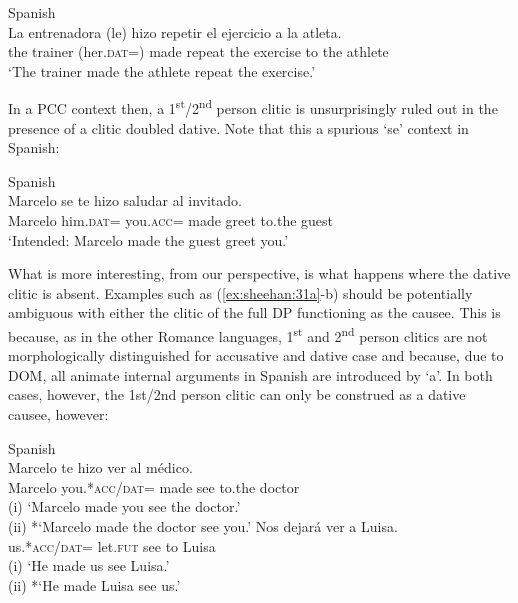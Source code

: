 \documentclass[output=paper,colorlinks,citecolor=brown,nonflat]{./langscibook}
\begin{document}
\ea%
    \label{ex:sheehan:29}
    Spanish \citep[448]{Torrego2010}\\
    \gll    La   entrenadora  (le)   hizo   repetir  el   ejercicio   a     la   atleta.\\
            the   trainer   (her.\textsc{dat}=)   made   repeat  the   exercise   to   the  athlete\\
    \glt    ‘The trainer made the athlete repeat the exercise.’
\z

In a PCC context then, a 1\textsuperscript{st}/2\textsuperscript{nd} person clitic is unsurprisingly ruled out in the presence of a clitic doubled dative. Note that this a spurious ‘se’ context in Spanish:

\ea%
    \label{ex:sheehan:30}
    Spanish\\
    \gll    *Marcelo   se   te   hizo   saludar  al   invitado.\\
            Marcelo   him.\textsc{dat}=  you.\textsc{acc}=  made   greet  to.the   guest\\
    \glt    ‘Intended: Marcelo made the guest greet you.’
\z

What is more interesting, from our perspective, is what happens where the dative clitic is absent. Examples such as (\ref{ex:sheehan:31a}-b) should be potentially ambiguous with either the clitic of the full DP functioning as the causee. This is because, as in the other Romance languages, 1\textsuperscript{st} and 2\textsuperscript{nd} person clitics are not morphologically distinguished for accusative and dative case and because, due to DOM, all animate internal arguments in Spanish are introduced by ‘a’.  In both cases, however, the 1st/2nd person clitic can only be construed as a dative causee, however:

\ea%
    \label{ex:sheehan:31}
    Spanish\\
    \ea\label{ex:sheehan:31a}
    \gll    Marcelo   te     hizo     ver   al   médico.\\
            Marcelo   you.*\textsc{acc/dat=}  made  see     to.the   doctor\\
    \glt    (i) ‘Marcelo made you see the doctor.’\\
            (ii) *‘Marcelo made the doctor see you.’
    \ex\label{ex:sheehan:31b}
    \gll    Nos     dejará   ver   a   Luisa.\\
            us.*\textsc{acc/dat=}   let.\textsc{fut}  see   to   Luisa\\
    \glt    (i) ‘He made us see Luisa.’\\
            (ii) *‘He made Luisa see us.’
    \z
\z
\end{document}
